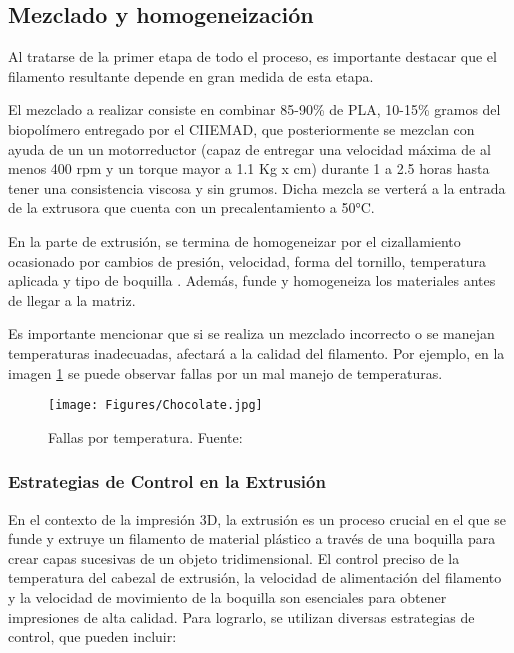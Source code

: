 \documentclass[14pt,oneside]{extarticle} %
\begin{document}
\subsection{Mezclado y homogeneización}

Al tratarse de la primer etapa de todo el proceso, es importante destacar que el filamento resultante depende en gran medida de esta etapa.

El mezclado a realizar consiste en combinar 85-90\% de PLA, 10-15\% gramos del biopolímero entregado por el CIIEMAD, que posteriormente se mezclan con ayuda de un un motorreductor (capaz de entregar una velocidad máxima de al menos 400 rpm y un torque mayor a 1.1 Kg x cm) durante 1 a 2.5 horas hasta tener una consistencia viscosa y sin grumos. Dicha mezcla se verterá a la entrada de la extrusora que cuenta con un precalentamiento a 50°C.

En la parte de extrusión, se termina de homogeneizar por el cizallamiento ocasionado por cambios de presión, velocidad, forma del tornillo, temperatura aplicada y tipo de boquilla \cite{mezcladora}. Además, funde y homogeneiza los materiales antes de llegar a la matriz.

Es importante mencionar que si se realiza un mezclado incorrecto o se manejan temperaturas inadecuadas, afectará a la calidad del filamento. Por ejemplo, en la imagen \ref{fig:Chocolate} se puede observar fallas por un mal manejo de temperaturas.

\begin{figure}[H]
    \centering
    \texttt{[image: Figures/Chocolate.jpg]}
    \caption{Fallas por temperatura. Fuente: \cite{chocolate}}
    \label{fig:Chocolate}
\end{figure}

\subsubsection{Estrategias de Control en la Extrusión}

En el contexto de la impresión 3D, la extrusión es un proceso crucial en el que se funde y extruye un filamento de material plástico a través de una boquilla para crear capas sucesivas de un objeto tridimensional. El control preciso de la temperatura del cabezal de extrusión, la velocidad de alimentación del filamento y la velocidad de movimiento de la boquilla son esenciales para obtener impresiones de alta calidad. Para lograrlo, se utilizan diversas estrategias de control, que pueden incluir:
\end{document}
